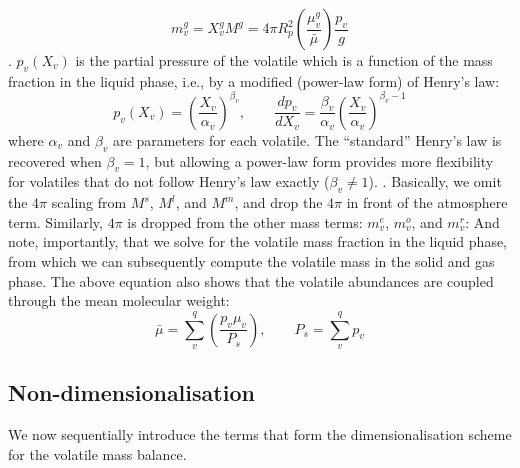 \begin{equation}
m_v^g = X_v^g M^g = 4 \pi R_p^2 \left( \frac{\mu_v^g}{\bar{\mu}} \right) \frac{p_v}{g}
\end{equation}
.  $p_v(X_v)$ is the partial pressure of the volatile which is a function of the mass fraction in the liquid phase, i.e., by a modified (power-law form) of Henry's law:
\begin{equation}
p_v ( X_v ) = \left( \frac{X_v}{\alpha_v} \right)^{\beta_v}, \qquad \frac{dp_v}{d X_v} = \frac{\beta_v}{\alpha_v} \left( \frac{X_v}{\alpha_v} \right)^{\beta_v-1}
\label{eq:Henry_mod}
\end{equation}
where $\alpha_v$ and $\beta_v$ are parameters for each volatile.  The ``standard'' Henry's law is recovered when $\beta_v=1$, but allowing a power-law form provides more flexibility for volatiles that do not follow Henry's law exactly ($\beta_v \neq 1$).  .  Basically, we omit the $4 \pi$ scaling from $M^s$, $M^l$, and $M^m$, and drop the $4 \pi$ in front of the atmosphere term.  Similarly, $4 \pi$ is dropped from the other mass terms: $m_v^e$, $m_v^o$, and $m_v^r$:
And note, importantly, that we solve for the volatile mass fraction in the liquid phase, from which we can subsequently compute the volatile mass in the solid and gas phase.  The above equation also shows that the volatile abundances are coupled through the mean molecular weight:
\begin{equation}
\bar{\mu} = \sum_v^q \left( \frac{p_v \mu_v}{P_s} \right), \qquad P_s = \sum_v^q p_v
\label{eq:atmosphere_molar_mass}
\end{equation}
\subsection{Non-dimensionalisation}
We now sequentially introduce the terms that form the dimensionalisation scheme for the volatile mass balance.
